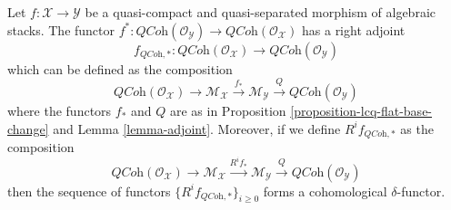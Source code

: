 \begin{proposition}
\label{proposition-direct-image-quasi-coherent}
Let $f : \mathcal{X} \to \mathcal{Y}$ be a quasi-compact and quasi-separated
morphism of algebraic stacks. The functor
$f^* : \textit{QCoh}(\mathcal{O}_\mathcal{Y}) \to
\textit{QCoh}(\mathcal{O}_\mathcal{X})$
has a right adjoint
$$
f_{\textit{QCoh}, *} :
\textit{QCoh}(\mathcal{O}_\mathcal{X})
\longrightarrow
\textit{QCoh}(\mathcal{O}_\mathcal{Y})
$$
which can be defined as the composition
$$
\textit{QCoh}(\mathcal{O}_\mathcal{X}) \to \mathcal{M}_\mathcal{X}
\xrightarrow{f_*} \mathcal{M}_\mathcal{Y}
\xrightarrow{Q} \textit{QCoh}(\mathcal{O}_\mathcal{Y})
$$
where the functors $f_*$ and $Q$ are as in
Proposition \ref{proposition-lcq-flat-base-change}
and
Lemma \ref{lemma-adjoint}.
Moreover, if we define $R^if_{\textit{QCoh}, *}$ as the composition
$$
\textit{QCoh}(\mathcal{O}_\mathcal{X}) \to \mathcal{M}_\mathcal{X}
\xrightarrow{R^if_*} \mathcal{M}_\mathcal{Y}
\xrightarrow{Q} \textit{QCoh}(\mathcal{O}_\mathcal{Y})
$$
then the sequence of functors $\{R^if_{\textit{QCoh}, *}\}_{i \geq 0}$
forms a cohomological $\delta$-functor.
\end{proposition}


